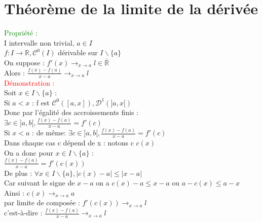 \documentclass{article}
\begin{document}
\section{Théorème de la limite de la dérivée}
\textcolor{green}{Propriété :} \\ 
I intervalle non trivial, $a \in I$ \\ 
$f: I \rightarrow \mathbb{R},\mathcal{C}^0(I)$ dérivable sur $I \backslash \lbrace a \rbrace$ \\ 
On suppose : $f'(x)\rightarrow_{x \rightarrow a} l \in \bar{\mathbb{R}}$ \\ 
Alors : $\frac{f(x)-f(a)}{x-a} \rightarrow_{x \rightarrow a} l$ \\ 
\textcolor{red}{Démonstration :} \\ 
Soit $x \in I \backslash \lbrace a \rbrace$ : \\ 
Si $a< x$ : f est $\mathcal{C}^0([a,x]),\mathcal{D}^1(]a,x[)$ \\ 
Donc par l'égalité des accroissements finis : \\ 
$ \exists c \in ]a,b[, \frac{f(x)-f(a)}{x-a}=f'(c) $ \\ 
Si $x < a$ : de même: $ \exists c \in ]a,b[, \frac{f(x)-f(a)}{x-a}=f'(c) $ \\ 
Dans chaque cas c dépend de x : notons c $c(x)$ \\ 
On a donc pour $x \in I \backslash \lbrace a \rbrace$ : \\ 
$ \frac{f(x)-f(a)}{x-a}=f'(c(x)) $ \\ 
De plus : $ \forall x \in I \backslash \lbrace a \rbrace, |c(x)-a| \leq |x-a|$ \\ 
Car suivant le signe de $x-a$ on a $c(x)-a \leq x-a$ ou $a-c(x) \leq a-x$ \\ 
Ainsi : $c(x) \rightarrow_{x \rightarrow a} a$ \\ 
par limite de composée : $f'(c(x)) \rightarrow_{x \rightarrow a}l$ \\ 
c'est-à-dire : $\frac{f(x)-f(a)}{x-a} \rightarrow_{x \rightarrow a} l$
\end{document}
